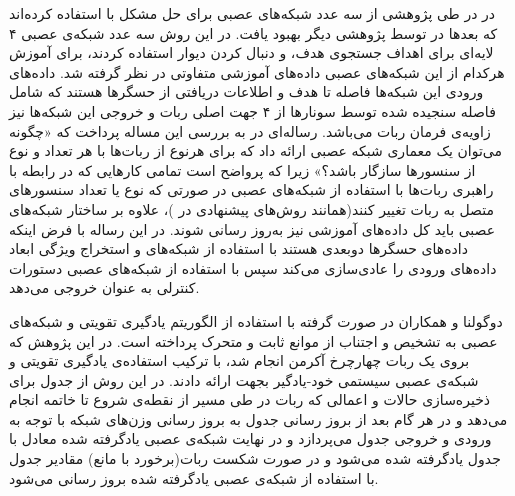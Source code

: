 در  در طی پژوهشی از سه عدد شبکه‌های عصبی برای حل مشکل  با استفاده کرده‌اند که بعدها در  توسط پژوهشی دیگر بهبود یافت. در این روش سه عدد شبکه‌ی عصبی ۴ لایه‌ای برای اهداف جستجوی هدف،  و دنبال کردن دیوار استفاده کردند، برای آموزش هرکدام از این شبکه‌های عصبی داده‌های آموزشی متفاوتی در نظر گرفته شد. داده‌های ورودی این شبکه‌ها فاصله تا هدف و اطلاعات دریافتی از حسگرها هستند که شامل فاصله سنجیده شده توسط سونارها از ۴ جهت اصلی ربات و خروجی این شبکه‌ها نیز زاویه‌ی فرمان ربات می‌باشد.
رساله‌ای در  به بررسی این مساله پرداخت که «چگونه می‌توان یک معماری شبکه عصبی ارائه داد که برای هرنوع از ربات‌ها با هر تعداد و نوع از سنسورها سازگار باشد؟» زیرا که پرواضح است تمامی کارهایی که در رابطه با راهبری ربات‌ها با استفاده از شبکه‌های عصبی در صورتی که نوع یا تعداد سنسورهای متصل به ربات تغییر کنند(همانند روش‌های پیشنهادی در )، علاوه بر ساختار شبکه‌های عصبی باید کل داده‌های آموزشی نیز به‌روز رسانی شوند. در این رساله با فرض اینکه داده‌های حسگرها دوبعدی هستند با استفاده از شبکه‌های  و استخراج ویژگی  ابعاد داده‌های ورودی را عادی‌سازی می‌کند سپس با استفاده از شبکه‌های عصبی دستورات کنترلی به عنوان خروجی می‌دهد.

دوگولنا و همکاران در  صورت گرفته با استفاده از الگوریتم یادگیری تقویتی  و شبکه‌های عصبی به تشخیص و اجتناب از موانع ثابت و متحرک پرداخته است. در این پژوهش که بروی یک ربات چهارچرخ آکرمن انجام شد، با ترکیب استفاده‌ی یادگیری تقویتی و شبکه‌ی عصبی سیستمی خود-یادگیر بجهت  ارائه دادند. در این روش از جدول  برای ذخیره‌سازی حالات و اعمالی که ربات در طی مسیر از نقطه‌ی شروع تا خاتمه انجام می‌دهد و در هر گام بعد از بروز رسانی جدول  به بروز رسانی وزن‌های شبکه با توجه به ورودی و خروجی جدول  می‌پردازد و در نهایت شبکه‌ی عصبی یادگرفته شده معادل با جدول یادگرفته شده  می‌شود و در صورت شکست ربات(برخورد با مانع) مقادیر جدول  با استفاده از شبکه‌ی عصبی یادگرفته شده بروز رسانی می‌شود.
